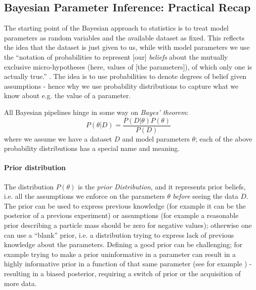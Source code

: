 \subsection{Bayesian Parameter Inference: Practical Recap}
The starting point of the Bayesian approach to statistics is to treat model parameters as random variables and the available dataset as fixed. This reflects the idea that the dataset is just given to us, while with model parameters we use the ``notation of probabilities to represent [our] \emph{beliefs} about the mutually exclusive micro-hypotheses (here, values of [the parameters]), of which only one is actually true.'' \cite{mckay}. The idea is to use probabilities to denote degrees of belief given assumptions - hence why we use probability distributions to capture what we know about e.g. the value of a parameter.

All Bayesian pipelines hinge in some way on \emph{Bayes' theorem}:
\begin{equation*}
    P(\theta|D) = \frac{P(D|\theta) P(\theta)}{P(D)}
\end{equation*}
where we assume we have a dataset $D$ and model parameters $\theta$; each of the above probability distributions has a special name and meaning.

\paragraph{Prior distribution}
The distribution $P(\theta)$ is the \emph{prior Distribution}, and it represents prior beliefs, i.e. all the assumptions we enforce on the parameters $\theta$ \emph{before} seeing the data $D$. The prior can be used to express previous knowledge (for example it can be the posterior of a previous experiment) or assumptions (for example a reasonable prior describing a particle mass should be zero for negative values); otherwise one can use a ``blank'' prior, i.e. a distribution trying to express lack of previous knowledge about the parameters. Defining a good prior can be challenging; for example trying to make a prior uninformative in a parameter can result in a highly informative prior in a function of that same parameter (see for example \cite{noninformative_priors} \cite{nsb_prior}) - resulting in a biased posterior, requiring a switch of prior or the acquisition of more data.

